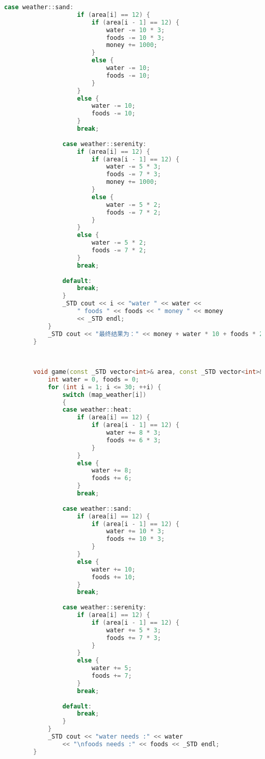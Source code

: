 \documentclass{cumcmthesis}
\begin{document}
\begin{appendices}
\begin{lstlisting}[language=c++]
				case weather::sand:
					if (area[i] == 12) {
						if (area[i - 1] == 12) {
							water -= 10 * 3;
							foods -= 10 * 3;
							money += 1000;
						}
						else {
							water -= 10;
							foods -= 10;
						}
					}
					else {
						water -= 10;
						foods -= 10;
					}
					break;
		
				case weather::serenity:
					if (area[i] == 12) {
						if (area[i - 1] == 12) {
							water -= 5 * 3;
							foods -= 7 * 3;
							money += 1000;
						}
						else {
							water -= 5 * 2;
							foods -= 7 * 2;
						}
					}
					else {
						water -= 5 * 2;
						foods -= 7 * 2;
					}
					break;
		
				default:
					break;
				}
				_STD cout << i << "water " << water <<
					" foods " << foods << " money " << money
					<< _STD endl;
			}
			_STD cout << "最终结果为：" << money + water * 10 + foods * 20 << _STD endl;
		}
		
		
		
		void game(const _STD vector<int>& area, const _STD vector<int>& mine) {
			int water = 0, foods = 0;
			for (int i = 1; i <= 30; ++i) {
				switch (map_weather[i])
				{
				case weather::heat:
					if (area[i] == 12) {
						if (area[i - 1] == 12) {
							water += 8 * 3;
							foods += 6 * 3;
						}
					}
					else {
						water += 8;
						foods += 6;
					}
					break;
		
				case weather::sand:
					if (area[i] == 12) {
						if (area[i - 1] == 12) {
							water += 10 * 3;
							foods += 10 * 3;
						}
					}
					else {
						water += 10;
						foods += 10;
					}
					break;
		
				case weather::serenity:
					if (area[i] == 12) {
						if (area[i - 1] == 12) {
							water += 5 * 3;
							foods += 7 * 3;
						}
					}
					else {
						water += 5;
						foods += 7;
					}
					break;
		
				default:
					break;
				}
			}
			_STD cout << "water needs :" << water
				<< "\nfoods needs :" << foods << _STD endl;
		}
		
\end{lstlisting}

\end{appendices}
\end{document}
